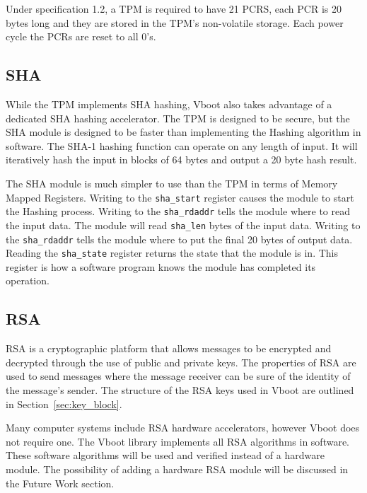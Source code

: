 \documentclass[../report.tex]{subfiles}
\def\code#1{\texttt{#1}}
\begin{document}
Under specification 1.2, a TPM is required to have 21 PCRS, each PCR is 20 bytes
long and they are stored in the TPM's non-volatile storage.
Each power cycle the PCRs are reset to all 0's.


\subsection{SHA}

While the TPM implements SHA hashing, Vboot also takes advantage of a dedicated
SHA hashing accelerator. 
The TPM is designed to be secure, but the SHA module is designed to be faster
than implementing the Hashing algorithm in software.
The SHA-1 hashing function can operate on any length of input.
It will iteratively hash the input in blocks of 64 bytes and output a 20 byte
hash result.


The SHA module is much simpler to use than the TPM in terms of Memory Mapped
Registers. 
Writing to the  \code{sha\_start} register causes the module to start the
Hashing process.
Writing to the \code{sha\_rdaddr} tells the module where to read the input data.
The module will read \code{sha\_len} bytes of the input data.
Writing to the \code{sha\_rdaddr} tells the module where to put the final 20
bytes of output data.
Reading the \code{sha\_state} register returns the state that the module is in.
This register is how a software program knows the module has completed its
operation.

\subsection{RSA}

RSA is a cryptographic platform that allows messages to be encrypted and
decrypted through the use of public and private keys.
The properties of RSA are used to send messages where the message receiver can
be sure of the identity of the message's sender. 
The structure of the RSA keys used in Vboot are outlined in
Section~\ref{sec:key_block}.

Many computer systems include RSA hardware accelerators, however Vboot does not
require one. 
The Vboot library implements all RSA algorithms in software.
These software algorithms will be used and verified instead of a hardware
module.
The possibility of adding a hardware RSA module will be discussed in the Future
Work section.
\end{document}
